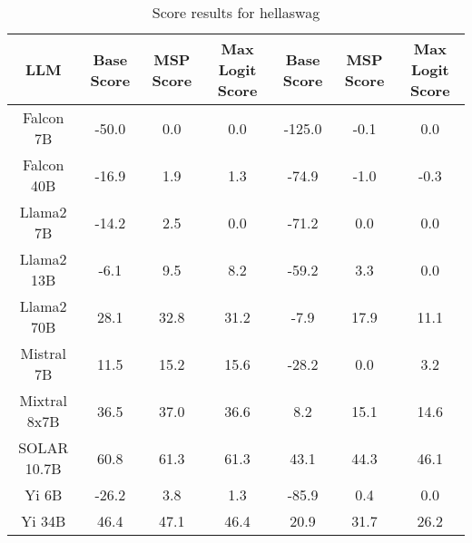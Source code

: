 \renewcommand\arraystretch{1.2}
\begin{table*}
\centering
\begin{tabular}{c|c|c|c|c|c|c}
LLM & Base Score & MSP Score & Max Logit Score & Base Score & MSP Score & Max Logit Score\\ \hline
Falcon 7B & -50.0 & 0.0 & 0.0 & -125.0 & -0.1 & 0.0\\
Falcon 40B & -16.9 & 1.9 & 1.3 & -74.9 & -1.0 & -0.3\\
Llama2 7B & -14.2 & 2.5 & 0.0 & -71.2 & 0.0 & 0.0\\
Llama2 13B & -6.1 & 9.5 & 8.2 & -59.2 & 3.3 & 0.0\\
Llama2 70B & 28.1 & 32.8 & 31.2 & -7.9 & 17.9 & 11.1\\
Mistral 7B & 11.5 & 15.2 & 15.6 & -28.2 & 0.0 & 3.2\\
Mixtral 8x7B & 36.5 & 37.0 & 36.6 & 8.2 & 15.1 & 14.6\\
SOLAR 10.7B & 60.8 & 61.3 & 61.3 & 43.1 & 44.3 & 46.1\\
Yi 6B & -26.2 & 3.8 & 1.3 & -85.9 & 0.4 & 0.0\\
Yi 34B & 46.4 & 47.1 & 46.4 & 20.9 & 31.7 & 26.2\\
\hline
\end{tabular}
\caption{Score results for hellaswag}
\end{table*}
\label{tab:hellaswag_score}
